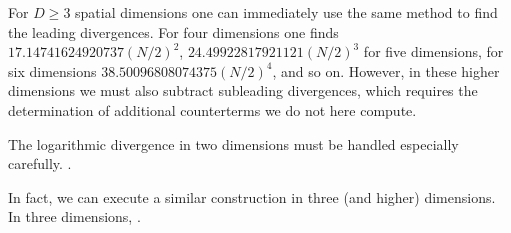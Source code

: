 For $D\geq3$ spatial dimensions one can immediately use the same method to find the leading divergences.
For four dimensions one finds $17.14741624920737 (N/2)^2$, $24.49922817921121 (N/2)^3$ for five dimensions, for six dimensions $38.50096808074375 (N/2)^4$, and so on.  However, in these higher dimensions we must also subtract subleading divergences, which requires the determination of additional counterterms we do not here compute.

The logarithmic divergence in two dimensions must be handled especially carefully.
.

In fact, we can execute a similar construction in three (and higher) dimensions.  In three dimensions, .
